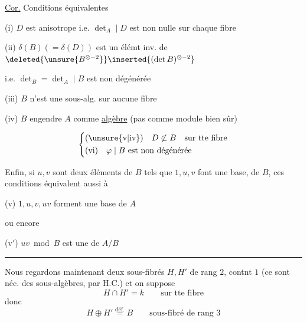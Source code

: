 \uline{Cor.} Conditions équivalentes

(i) $D$ est anisotrope i.e. $\det_A\mid D$ est non nulle sur chaque fibre

(ii) $\delta(B)(=\delta(D))$ est un élémt inv. de $\deleted{\unsure{B^{\otimes-2}}}\inserted{(\det B)^{\otimes-2}}$


i.e. $\det_B=\det_A\mid B$ est non dégénérée

(iii) $B$ n'est une sous-alg. sur aucune fibre

(iv) $B$ engendre $A$ comme \uline{algèbre} (pas comme module bien sûr)

\[
\left\{\begin{aligned}
&(\mathrm{\unsure{v|iv}})\quad D\not\subset B\quad\text{sur tte fibre}\\
&(\mathrm{vi})\quad\varphi\mid B\text{ est non dégénérée}
\end{aligned}\right.
\]

Enfin, si $u,v$ sont deux éléments de $B$ tels que $1,u,v$ font une base, de $B$, ces conditions équivalent aussi à

(v) $1,u,v,uv$ forment une base de $A$

ou encore

(v$'$) $uv\bmod B$ est une   de $A/B$

\begin{center}\rule{1.5cm}{0.35pt}\end{center}


Nous regardons maintenant deux sous-fibrés   $H,H'$ de rang $2$, contnt $1$ (ce sont néc. des sous-algèbres, par H.C.) et on suppose
\[
H\cap H'=k\qquad\text{sur tte fibre}
\]
donc
\[
H\oplus H'\overset{\text{déf.}}{=}B\qquad\text{sous-fibré de rang }3
\]
